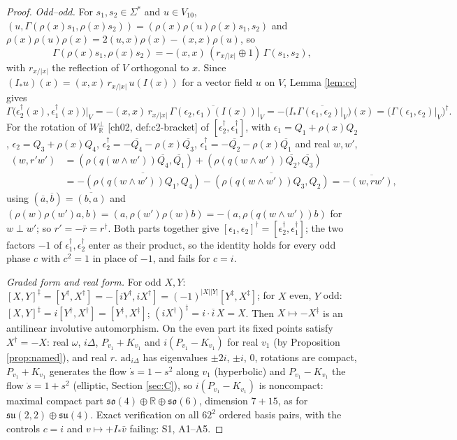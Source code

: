\documentclass[11pt]{article}
\theoremstyle{definition}
\begin{document}
\begin{proof}
\emph{Odd--odd.} For $s_1,s_2\in\Sigma^*$ and $u\in V_{10}$, $(u,\Gamma(\rho(x)s_1,\rho(x)s_2))=(\rho(x)\rho(u)\rho(x)s_1,s_2)$ and $\rho(x)\rho(u)\rho(x)=2(u,x)\rho(x)-(x,x)\rho(u)$, so
\[
\Gamma(\rho(x)s_1,\rho(x)s_2)=-(x,x)\,(r_{x/|x|}\oplus1)\,\Gamma(s_1,s_2),
\]
with $r_{x/|x|}$ the reflection of $V$ orthogonal to $x$. Since $(I_*u)(x)=(x,x)\,r_{x/|x|}\,u(I(x))$ for a vector field $u$ on $V$, Lemma \ref{lem:cc} gives
\[
\Gamma\big(\epsilon_2^\dagger(x),\epsilon_1^\dagger(x)\big)\big|_V=-(x,x)\,r_{x/|x|}\,\overline{\Gamma(\epsilon_2,\epsilon_1)(I(x))}\big|_V=-\big(I_*\overline{\Gamma(\epsilon_1,\epsilon_2)|_V}\big)(x)=\big(\Gamma(\epsilon_1,\epsilon_2)|_V\big)^\dagger .
\]
For the rotation of $W_{\mathbb R}^\perp$ [ch02, def:c2-bracket] of $[\epsilon_2^\dagger,\epsilon_1^\dagger]$, with $\epsilon_1=Q_1+\rho(x)Q_2$, $\epsilon_2=Q_3+\rho(x)Q_4$, $\epsilon_2^\dagger=-\overline{Q_4}-\rho(x)\overline{Q_3}$, $\epsilon_1^\dagger=-\overline{Q_2}-\rho(x)\overline{Q_1}$ and real $w,w'$,
\[
\begin{aligned}
(w,r'w')&=(\rho(q(w\wedge w'))\overline{Q_4},\overline{Q_1})+(\rho(q(w\wedge w'))\overline{Q_2},\overline{Q_3})\\
&=-\overline{(\rho(q(w\wedge w'))Q_1,Q_4)}-\overline{(\rho(q(w\wedge w'))Q_3,Q_2)}=-\overline{(w,rw')},
\end{aligned}
\]
using $(\overline{a},\overline{b})=\overline{(b,a)}$ and $(\rho(w)\rho(w')a,b)=(a,\rho(w')\rho(w)b)=-(a,\rho(q(w\wedge w'))b)$ for $w\perp w'$; so $r'=-\bar r=r^\dagger$. Both parts together give $[\epsilon_1,\epsilon_2]^\dagger=[\epsilon_2^\dagger,\epsilon_1^\dagger]$; the two factors $-1$ of $\epsilon_1^\dagger,\epsilon_2^\dagger$ enter as their product, so the identity holds for every odd phase $c$ with $c^2=1$ in place of $-1$, and fails for $c=i$.

\emph{Graded form and real form.} For odd $X,Y$: $[X,Y]^\ddagger=[Y^\dagger,X^\dagger]=-[iY^\dagger,iX^\dagger]=(-1)^{|X||Y|}[Y^\ddagger,X^\ddagger]$; for $X$ even, $Y$ odd: $[X,Y]^\ddagger=i[Y^\dagger,X^\dagger]=[Y^\ddagger,X^\ddagger]$; $(iX^\dagger)^\ddagger=i\cdot\overline{i}\,X=X$. Then $X\mapsto-X^\ddagger$ is an antilinear involutive automorphism. On the even part its fixed points satisfy $X^\dagger=-X$: real $\omega$, $i\Delta$, $P_{v_1}+K_{v_1}$ and $i(P_{v_1}-K_{v_1})$ for real $v_1$ (by Proposition \ref{prop:named}), and real $r$. $\mathrm{ad}_{i\Delta}$ has eigenvalues $\pm2i$, $\pm i$, $0$, rotations are compact, $P_{v_1}+K_{v_1}$ generates the flow $\dot s=1-s^2$ along $v_1$ (hyperbolic) and $P_{v_1}-K_{v_1}$ the flow $\dot s=1+s^2$ (elliptic, Section \ref{sec:C}), so $i(P_{v_1}-K_{v_1})$ is noncompact: maximal compact part $\mathfrak{so}(4)\oplus\mathbb R\oplus\mathfrak{so}(6)$, dimension $7+15$, as for $\mathfrak{su}(2,2)\oplus\mathfrak{su}(4)$. Exact verification on all $62^2$ ordered basis pairs, with the controls $c=i$ and $v\mapsto+I_*\bar v$ failing: S1, A1--A5.
\end{proof}
\end{document}
